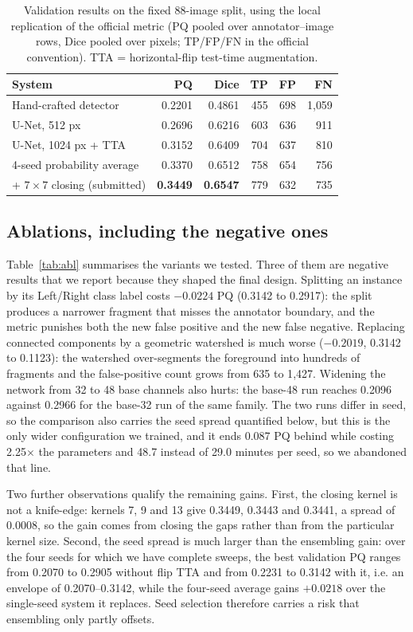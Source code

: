 \documentclass[sigconf]{acmart}
\begin{document}
\begin{table}[t]
\footnotesize
\setlength{\tabcolsep}{3.6pt}
\caption{Validation results on the fixed 88-image split, using the local
replication of the official metric (PQ pooled over annotator--image rows, Dice
pooled over pixels; TP/FP/FN in the official convention). TTA = horizontal-flip
test-time augmentation.}
\label{tab:main}
\begin{tabular}{lrrrrr}
\toprule
System & PQ & Dice & TP & FP & FN \\
\midrule
Hand-crafted detector & 0.2201 & 0.4861 & 455 & 698 & 1{,}059 \\
U-Net, 512 px & 0.2696 & 0.6216 & 603 & 636 & 911 \\
U-Net, 1024 px + TTA & 0.3152 & 0.6409 & 704 & 637 & 810 \\
4-seed probability average & 0.3370 & 0.6512 & 758 & 654 & 756 \\
\quad + $7\times7$ closing (submitted) & \textbf{0.3449} & \textbf{0.6547} & 779 & 632 & 735 \\
\bottomrule
\end{tabular}
\end{table}

\subsection{Ablations, including the negative ones}
\label{sec:ablation}
Table~\ref{tab:abl} summarises the variants we tested. Three of them are
negative results that we report because they shaped the final design.
Splitting an instance by its Left/Right class label costs $-0.0224$ PQ
(0.3142 to 0.2917): the split produces a narrower fragment that misses the
annotator boundary, and the metric punishes both the new false positive and
the new false negative. Replacing connected components by a geometric
watershed is much worse ($-0.2019$, 0.3142 to 0.1123): the watershed
over-segments the foreground into hundreds of fragments and the false-positive
count grows from 635 to 1{,}427. Widening the network from 32 to 48 base
channels also hurts: the base-48 run reaches 0.2096 against 0.2966 for the
base-32 run of the same family. The two runs differ in seed, so the comparison
also carries the seed spread quantified below, but this is the only wider
configuration we trained, and it ends 0.087 PQ behind while costing 2.25$\times$
the parameters and 48.7 instead of 29.0 minutes per seed, so we abandoned that
line.

Two further observations qualify the remaining gains. First, the closing kernel
is not a knife-edge: kernels 7, 9 and 13 give 0.3449, 0.3443 and 0.3441, a
spread of 0.0008, so the gain comes from closing the gaps rather than from the
particular kernel size. Second, the seed spread is much larger than the
ensembling gain: over the four seeds for which we have complete sweeps, the
best validation PQ ranges from 0.2070 to 0.2905 without flip TTA and from
0.2231 to 0.3142 with it, i.e. an envelope of 0.2070--0.3142, while the
four-seed average gains $+0.0218$ over the single-seed system it replaces.
Seed selection therefore carries a risk that ensembling only partly offsets.
\end{document}
